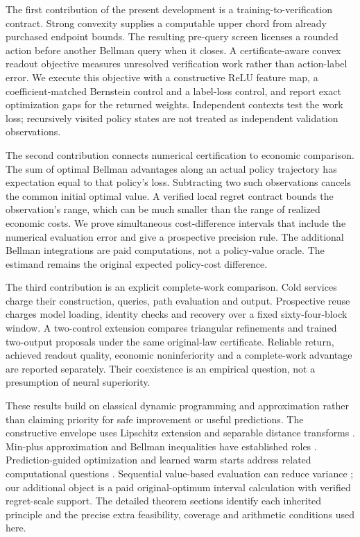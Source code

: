 \documentclass[ecta,nameyear,draft]{econsocart}
\begin{document}
The first contribution of the present development is a training-to-verification contract. Strong convexity supplies a computable upper chord from already purchased endpoint bounds. The resulting pre-query screen licenses a rounded action before another Bellman query when it closes. A certificate-aware convex readout objective measures unresolved verification work rather than action-label error. We execute this objective with a constructive ReLU feature map, a coefficient-matched Bernstein control and a label-loss control, and report exact optimization gaps for the returned weights. Independent contexts test the work loss; recursively visited policy states are not treated as independent validation observations.

The second contribution connects numerical certification to economic comparison. The sum of optimal Bellman advantages along an actual policy trajectory has expectation equal to that policy's loss. Subtracting two such observations cancels the common initial optimal value. A verified local regret contract bounds the observation's range, which can be much smaller than the range of realized economic costs. We prove simultaneous cost-difference intervals that include the numerical evaluation error and give a prospective precision rule. The additional Bellman integrations are paid computations, not a policy-value oracle. The estimand remains the original expected policy-cost difference.

The third contribution is an explicit complete-work comparison. Cold services charge their construction, queries, path evaluation and output. Prospective reuse charges model loading, identity checks and recovery over a fixed sixty-four-block window. A two-control extension compares triangular refinements and trained two-output proposals under the same original-law certificate. Reliable return, achieved readout quality, economic noninferiority and a complete-work advantage are reported separately. Their coexistence is an empirical question, not a presumption of neural superiority.

These results build on classical dynamic programming and approximation rather than claiming priority for safe improvement or useful predictions. The constructive envelope uses Lipschitz extension \citep{mcshane1934} and separable distance transforms \citep{felzenszwalb2012}. Min-plus approximation and Bellman inequalities have established roles \citep{lakshminarayanan2014,wang2015}. Prediction-guided optimization and learned warm starts address related computational questions \citep{sakaue2023warm,sambharya2023}. Sequential value-based evaluation can reduce variance \citep{jiang2016}; our additional object is a paid original-optimum interval calculation with verified regret-scale support. The detailed theorem sections identify each inherited principle and the precise extra feasibility, coverage and arithmetic conditions used here.
\end{document}

